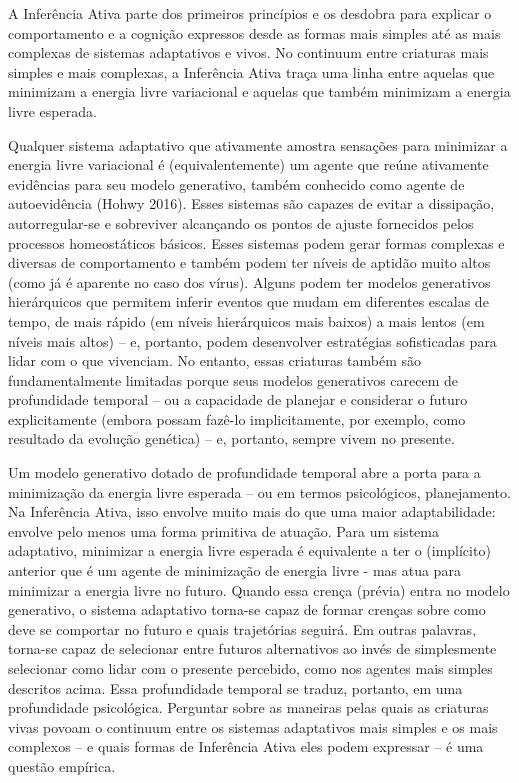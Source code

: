 \documentclass[
  12pt,
]{book}
\begin{document}
A Inferência Ativa parte dos primeiros princípios e os desdobra para explicar o comportamento e a cognição expressos desde as formas mais simples até as mais complexas de sistemas adaptativos e vivos. No continuum entre criaturas mais simples e mais complexas, a Inferência Ativa traça uma linha entre aquelas que minimizam a energia livre variacional e aquelas que também minimizam a energia livre esperada.

Qualquer sistema adaptativo que ativamente amostra sensações para minimizar a energia livre variacional é (equivalentemente) um agente que reúne ativamente evidências para seu modelo generativo, também conhecido como agente de autoevidência (Hohwy 2016). Esses sistemas são capazes de evitar a dissipação, autorregular-se e sobreviver alcançando os pontos de ajuste fornecidos pelos processos homeostáticos básicos. Esses sistemas podem gerar formas complexas e diversas de comportamento e também podem ter níveis de aptidão muito altos (como já é aparente no caso dos vírus). Alguns podem ter modelos generativos hierárquicos que permitem inferir eventos que mudam em diferentes escalas de tempo, de mais rápido (em níveis hierárquicos mais baixos) a mais lentos (em níveis mais altos) -- e, portanto, podem desenvolver estratégias sofisticadas para lidar com o que vivenciam. No entanto, essas criaturas também são fundamentalmente limitadas porque seus modelos generativos carecem de profundidade temporal -- ou a capacidade de planejar e considerar o futuro explicitamente (embora possam fazê-lo implicitamente, por exemplo, como resultado da evolução genética) -- e, portanto, sempre vivem no presente.

Um modelo generativo dotado de profundidade temporal abre a porta para a minimização da energia livre esperada -- ou em termos psicológicos, planejamento. Na Inferência Ativa, isso envolve muito mais do que uma maior adaptabilidade: envolve pelo menos uma forma primitiva de atuação. Para um sistema adaptativo, minimizar a energia livre esperada é equivalente a ter o (implícito) anterior que é um agente de minimização de energia livre - mas atua para minimizar a energia livre no futuro. Quando essa crença (prévia) entra no modelo generativo, o sistema adaptativo torna-se capaz de formar crenças sobre como deve se comportar no futuro e quais trajetórias seguirá. Em outras palavras, torna-se capaz de selecionar entre futuros alternativos ao invés de simplesmente selecionar como lidar com o presente percebido, como nos agentes mais simples descritos acima. Essa profundidade temporal se traduz, portanto, em uma profundidade psicológica. Perguntar sobre as maneiras pelas quais as criaturas vivas povoam o continuum entre os sistemas adaptativos mais simples e os mais complexos -- e quais formas de Inferência Ativa eles podem expressar -- é uma questão empírica.
\end{document}
